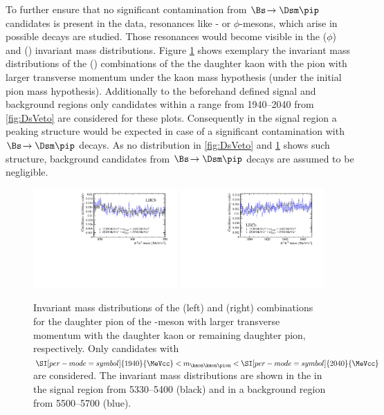 To further ensure that no significant contamination from $\Bs\!\to\Dsm\pip$ candidates is present in the data, resonances like \Kstarz- or $\phi$-mesons, which arise in possible \Dsm decays are studied.
Those resonances would become visible in the \kaon\kaon ($\phi$) and \kaon\pion (\Kstarz) invariant mass distributions.
Figure \ref{fig:phi_Kst_veto} shows exemplary the invariant mass distributions of the \kaon\kaon (\kaon\pion) combinations of the the daughter kaon with the
pion with larger transverse momentum under the kaon mass hypothesis (under the initial pion mass hypothesis).
Additionally to the beforehand defined signal and background regions only candidates within a range from \SIrange[per-mode=symbol]{1940}{2040}{\MeVcc} from \cref{fig:DsVeto} are considered for these plots.
Consequently in the signal region a peaking structure would be expected in case of a significant contamination with $\Bs\!\to\Dsm\pip$ decays.
As no distribution in \cref{fig:DsVeto} and \cref{fig:phi_Kst_veto} shows such structure, background candidates from $\Bs\!\to\Dsm\pip$ decays are assumed to be negligible.
\begin{figure}[tbp]
    \centering
    \includegraphics[width=0.49\textwidth]{06selection/figs/KstarHypo2.pdf}
    \includegraphics[width=0.49\textwidth]{06selection/figs/PhiHypo2.pdf}
    \caption{Invariant mass distributions of the \kaon\pion (left) and \kaon\kaon (right) combinations for the daughter pion of the \Dm-meson with larger transverse momentum with the daughter kaon or remaining daughter pion, respectively.
    Only candidates with $\SI[per-mode=symbol]{1940}{\MeVcc}<m_{\kaon\kaon\pion}<\SI[per-mode=symbol]{2040}{\MeVcc}$ are considered.
    The invariant mass distributions are shown in the in the \Bs signal region from \SIrange[per-mode=symbol]{5330}{5400}{\MeVcc} (black) and in a background region from \SIrange[per-mode=symbol]{5500}{5700}{\MeVcc} (blue).}
    \label{fig:phi_Kst_veto}
\end{figure}

